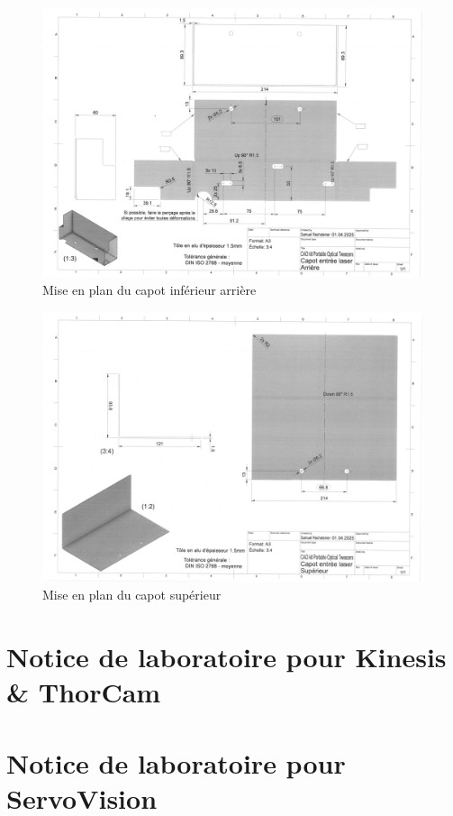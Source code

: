 \begin{figure}[H]
    \centering
    \includegraphics[angle=90,width=\textwidth]{assets/figures/Annexes/Mises_en_plan/mise_en_plan_arriere.png}
    \caption{Mise en plan du capot inférieur arrière}
    \label{mise_en_plan_capot_arriere}
\end{figure}

\begin{figure}[H]
    \centering
    \includegraphics[angle=90,width=\textwidth]{assets/figures/Annexes/Mises_en_plan/mise_en_plan_superieur.png}
    \caption{Mise en plan du capot supérieur}
    \label{mise_en_plan_capot_superieur}
\end{figure}

\clearpage
\section*{Notice de laboratoire pour Kinesis \& ThorCam} \label{annexe:notice_labo_Kinesis_ThorCam}


\section*{Notice de laboratoire pour ServoVision} \label{annexe:notice_labo_ServoVision}
